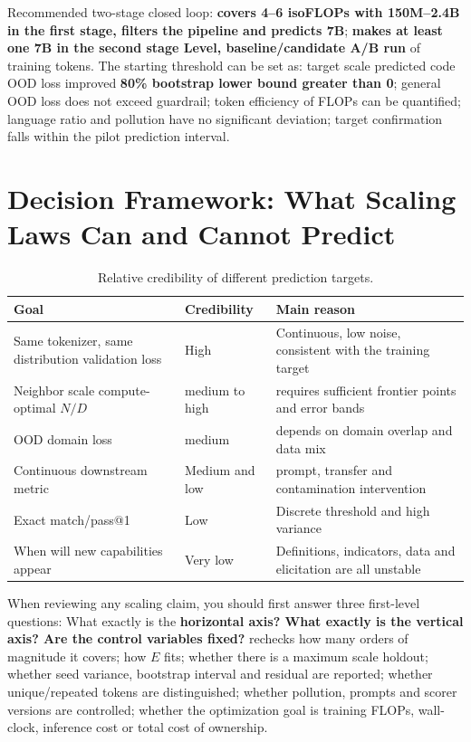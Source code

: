 \documentclass[UTF8,10pt,a4paper,fontset=none]{ctexart}
\begin{document}
Recommended two-stage closed loop: \textbf{ covers 4--6 isoFLOPs with 150M--2.4B in the first stage, filters the pipeline and predicts 7B}; \textbf{ makes at least one 7B in the second stage Level, baseline/candidate A/B run} of training tokens. The starting threshold can be set as: target scale predicted code OOD loss improved \textbf{80\% bootstrap lower bound greater than 0}; general OOD loss does not exceed guardrail; token efficiency of FLOPs can be quantified; language ratio and pollution have no significant deviation; target confirmation falls within the pilot prediction interval.

\section{Decision Framework: What Scaling Laws Can and Cannot Predict}

\begin{table}[htbp]
\centering
\caption{Relative credibility of different prediction targets.}
\label{tab:predictability}
\begin{tabularx}{\textwidth}{Y C{2.0cm} Y}
\toprule
Goal & Credibility & Main reason \\
\midrule
Same tokenizer, same distribution validation loss & High & Continuous, low noise, consistent with the training target \\
Neighbor scale compute-optimal $N/D$ & medium to high & requires sufficient frontier points and error bands \\
OOD domain loss & medium & depends on domain overlap and data mix \\
Continuous downstream metric & Medium and low & prompt, transfer and contamination intervention \\
Exact match/pass@1 & Low & Discrete threshold and high variance \\
When will new capabilities appear & Very low & Definitions, indicators, data and elicitation are all unstable \\
\bottomrule
\end{tabularx}
\end{table}

When reviewing any scaling claim, you should first answer three first-level questions: What exactly is the \textbf{ horizontal axis? What exactly is the vertical axis? Are the control variables fixed? } rechecks how many orders of magnitude it covers; how $E$ fits; whether there is a maximum scale holdout; whether seed variance, bootstrap interval and residual are reported; whether unique/repeated tokens are distinguished; whether pollution, prompts and scorer versions are controlled; whether the optimization goal is training FLOPs, wall-clock, inference cost or total cost of ownership.
\end{document}
